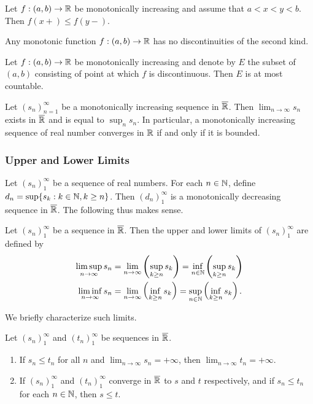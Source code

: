 \documentclass[12pt]{article} %
\begin{document}
\begin{corollary}
    Let $f : (a, b) \to \mathbb{R}$ be monotonically increasing and assume that $a < x < y < b$. Then $f(x+) \leq f(y-)$.
\end{corollary}

\begin{corollary}
    Any monotonic function $f : (a, b) \to \mathbb{R}$ has no discontinuities of the second kind.
\end{corollary}

\begin{theorem}
    Let $f : (a, b) \to \mathbb{R}$ be monotonically increasing and denote by $E$ the subset of $(a, b)$ consisting of point at which $f$ is discontinuous. Then $E$ is at most countable.
\end{theorem}

\begin{theorem}
    Let $(s_n)_{n=1}^{\infty}$ be a monotonically increasing sequence in $\overline{\mathbb{R}}$. Then $\lim_{n \to \infty} s_n$ exists in $\overline{\mathbb{R}}$ and is equal to $\sup_n s_n$. In particular, a monotonically increasing sequence of real number converges in $\mathbb{R}$ if and only if it is bounded.
\end{theorem}

\subsubsection{Upper and Lower Limits}

Let $(s_n)_1^\infty$ be a sequence of real numbers. For each $n \in \mathbb{N}$, define $d_n = \sup\{s_k : k \in \mathbb{N}, k \geq n\}$. Then $(d_n)_1^\infty$ is a monotonically decreasing sequence in $\overline{\mathbb{R}}$. The following thus makes sense.

\begin{definition}
    Let $(s_n)_1^\infty$ be a sequence in $\overline{\mathbb{R}}$. Then the upper and lower limits of $(s_n)_1^\infty$ are defined by \begin{align*}
        \limsup_{n \to \infty} s_n &= \lim_{n \to \infty} \left( \sup_{k \geq n} s_k \right) = \inf_{n \in \mathbb{N}} \left( \sup_{k \geq n} s_k \right)\\
        \liminf_{n \to \infty} s_n &= \lim_{n \to \infty} \left( \inf_{k \geq n} s_k \right) = \sup_{n \in \mathbb{N}} \left( \inf_{k \geq n} s_k \right).
    \end{align*}
\end{definition}

We briefly characterize such limits.

\begin{proposition}
    Let $(s_n)_1^\infty$ and $(t_n)_1^\infty$ be sequences in $\overline{\mathbb{R}}$. \begin{enumerate}
        \item If $s_n \leq t_n$ for all $n$ and $\lim_{n \to \infty} s_n = +\infty$, then $\lim_{n \to \infty} t_n = +\infty$.
        \item If $(s_n)_1^\infty$ and $(t_n)_1^\infty$ converge in $\overline{\mathbb{R}}$ to $s$ and $t$ respectively, and if $s_n \leq t_n$ for each $n \in \mathbb{N}$, then $s \leq t$.
    \end{enumerate}
\end{proposition}
\end{document}
